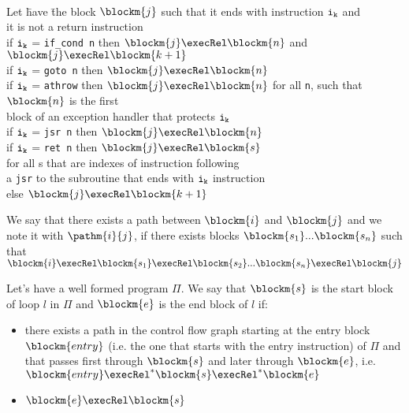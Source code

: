\begin{defn}\label{execRel}
\begin{tabbing}
\\Let \=  have \= the block $\blockm{j}$ such that  it ends with instruction $\tt{i_{k}}$ and \\
it is not a return instruction\\
\>  if $\tt{i_{k}}$ = \texttt{if\_cond n} then   $\blockm{j} \execRel \blockm{n}$ and $\blockm{j} \execRel  \blockm{k+1} $ \\
\>  if $\tt{i_{k}}$ = \texttt{goto n} then $\blockm{j} \execRel \blockm{n}$ \\
\>  if $\tt{i_{k}}$ = \texttt{athrow} then $\blockm{j} \execRel \blockm{n}$ for all \texttt{n}, such that $\blockm{n}$ is the first\\
\> \> block of an exception handler that protects $\tt{i_{k}}$ \\
\>  if $\tt{i_{k}}$ = \texttt{jsr n} then $\blockm{j} \execRel \blockm{n}$ \\
\>  if  $\tt{i_{k}}$ = \texttt{ret n} then  $ \blockm{j} \execRel \blockm{s}$\\
\> \> for all s that are indexes of instruction following \\
\> \> a \texttt{jsr} to the subroutine that ends with $\tt{i_{k}}$ instruction\\
\>  else $\blockm{j}  \execRel   \blockm{k+1}$
\end{tabbing}
\end{defn}

We say that there exists a path between $\blockm{i}$ and $\blockm{j}$ and we note it with  $\pathm{i}{j}$, if there exists blocks 
$\blockm{s_{1}}... \blockm{s_{n}}$ such that $\blockm{i} \execRel \blockm{s_{1}} \execRel \blockm{s_{2}}... \blockm{s_{n}} \execRel  \blockm{j}$
\begin{defn}
\label{defLoop}
Let's have a well formed program $\Pi$. We say that $\blockm{s}$ is the start block of loop $l$ in $\Pi$ and $\blockm{e}$ is the end block of $l$ if:
\begin{itemize}
\item there exists a path in the control flow graph starting at the entry block $\blockm{entry}$ (i.e. the one
 that starts with the entry instruction) of $\Pi$ and that passes first through $\blockm{s}$ and later through $\blockm{e}$,
  i.e.$ \blockm{entry} \execRel^{*}  \blockm{s} \execRel^{*} \blockm{e}$
\item $\blockm{e} \execRel \blockm{s}$
\end{itemize}
\end{defn}


